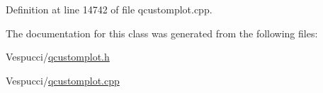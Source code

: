 Definition at line 14742 of file qcustomplot.\+cpp.



The documentation for this class was generated from the following files\+:\begin{DoxyCompactItemize}
\item 
Vespucci/\hyperlink{qcustomplot_8h}{qcustomplot.\+h}\item 
Vespucci/\hyperlink{qcustomplot_8cpp}{qcustomplot.\+cpp}\end{DoxyCompactItemize}
